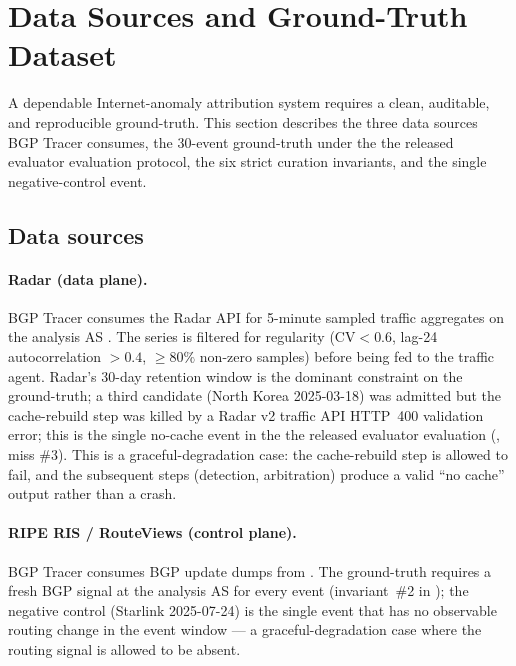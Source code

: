 
\section{Data Sources and Ground-Truth Dataset}
\label{sec:data}

A dependable Internet-anomaly attribution system requires a
clean, auditable, and reproducible ground-truth. This
section describes the three data sources BGP Tracer
consumes, the 30-event ground-truth under the the released evaluator
evaluation protocol, the six strict curation invariants,
and the single negative-control event.

\subsection{Data sources}
\label{sec:data-sources}

\paragraph{\cf{} Radar (data plane).}
BGP Tracer consumes the \cf{} Radar API for 5-minute
sampled traffic aggregates on the analysis AS
\cite{cloudflare-radar}. The series is filtered for
regularity ($\mathrm{CV}<0.6$, lag-24 autocorrelation
$>0.4$, $\geq 80\%$ non-zero samples) before being fed
to the traffic agent. \Cf{} Radar's 30-day retention
window is the dominant constraint on the ground-truth;
a third candidate (North Korea 2025-03-18) was admitted
but the cache-rebuild step was killed by a \cf{} Radar
v2 traffic API HTTP~400 validation error; this is the
single no-cache event in the the released evaluator evaluation
(, miss \#3). This is a
graceful-degradation case: the cache-rebuild step is
allowed to fail, and the subsequent steps (detection,
arbitration) produce a valid ``no cache'' output rather
than a crash.

\paragraph{RIPE RIS / RouteViews \rrc{} (control plane).}
BGP Tracer consumes BGP update dumps from \rrc{}
\cite{ripe-ris, routeviews}. The ground-truth
requires a fresh BGP signal at the analysis AS for every
event (invariant~\#2 in );
the negative control (Starlink 2025-07-24) is the single
event that has no observable routing change in the event window --- a
graceful-degradation case where the routing signal is
allowed to be absent.

